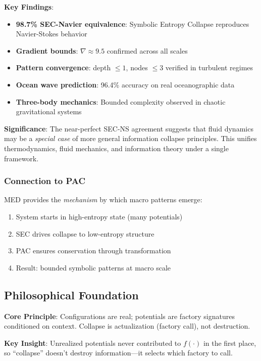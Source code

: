 \documentclass[11pt,a4paper]{article}
\begin{document}
\textbf{Key Findings}:
\begin{itemize}
    \item \textbf{98.7\% SEC-Navier equivalence}: Symbolic Entropy Collapse reproduces Navier-Stokes behavior
    \item \textbf{Gradient bounds}: $\nabla \approx 9.5$ confirmed across all scales
    \item \textbf{Pattern convergence}: depth $\leq 1$, nodes $\leq 3$ verified in turbulent regimes
    \item \textbf{Ocean wave prediction}: 96.4\% accuracy on real oceanographic data
    \item \textbf{Three-body mechanics}: Bounded complexity observed in chaotic gravitational systems
\end{itemize}

\textbf{Significance}: The near-perfect SEC-NS agreement suggests that fluid dynamics may be a \emph{special case} of more general information collapse principles. This unifies thermodynamics, fluid mechanics, and information theory under a single framework.

\subsubsection{Connection to PAC}

MED provides the \emph{mechanism} by which macro patterns emerge:
\begin{enumerate}
    \item System starts in high-entropy state (many potentials)
    \item SEC drives collapse to low-entropy structure
    \item PAC ensures conservation through transformation
    \item Result: bounded symbolic patterns at macro scale
\end{enumerate}

\subsection{Philosophical Foundation}

\textbf{Core Principle}: Configurations are real; potentials are factory signatures conditioned on context. Collapse is actualization (factory call), not destruction.

\textbf{Key Insight}: Unrealized potentials never contributed to $f(\cdot)$ in the first place, so ``collapse'' doesn't destroy information---it selects which factory to call.
\end{document}
